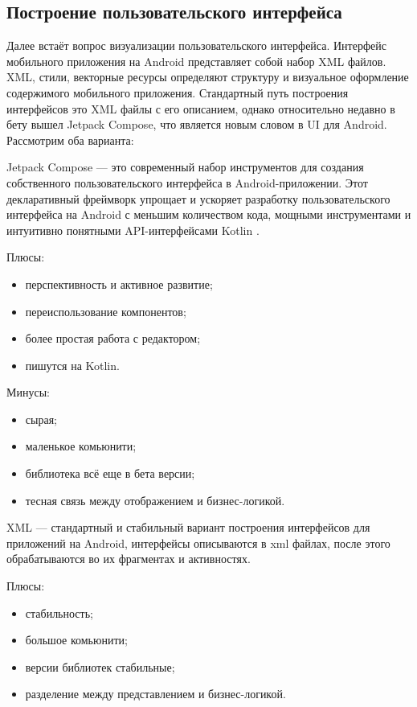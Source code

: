 \subsection{Построение пользовательского интерфейса}
Далее встаёт вопрос визуализации пользовательского интерфейса. Интерфейс мобильного приложения на Android представляет собой набор XML файлов. 
XML, стили, векторные ресурсы определяют структуру и визуальное оформление содержимого мобильного приложения. Стандартный путь построения интерфейсов это XML файлы с его описанием, однако относительно недавно в бету вышел Jetpack Compose, что является новым словом в UI для Android. Рассмотрим оба варианта:

Jetpack Compose — это современный набор инструментов для создания собственного пользовательского интерфейса в Android-приложении. Этот декларативный фреймворк упрощает и ускоряет разработку пользовательского интерфейса на Android с меньшим количеством кода, мощными инструментами и интуитивно понятными API-интерфейсами Kotlin \cite{web13}.
 
Плюсы:
\begin{itemize}
 \item перспективность и активное развитие;
 \item переиспользование компонентов;
 \item более простая работа с редактором;
 \item пишутся на Kotlin.
\end{itemize}

Минусы:
\begin{itemize}
 \item сырая;
 \item маленькое комьюнити;
 \item библиотека всё еще в бета версии;
 \item тесная связь между отображением и бизнес-логикой.
\end{itemize}

XML — стандартный и стабильный вариант построения интерфейсов для приложений на Android, интерфейсы описываются в xml файлах, после этого обрабатываются во их фрагментах и активностях.

Плюсы:
\begin{itemize}
 \item стабильность;
 \item большое комьюнити;
 \item версии библиотек стабильные;
 \item разделение между представлением и бизнес-логикой.
\end{itemize}

